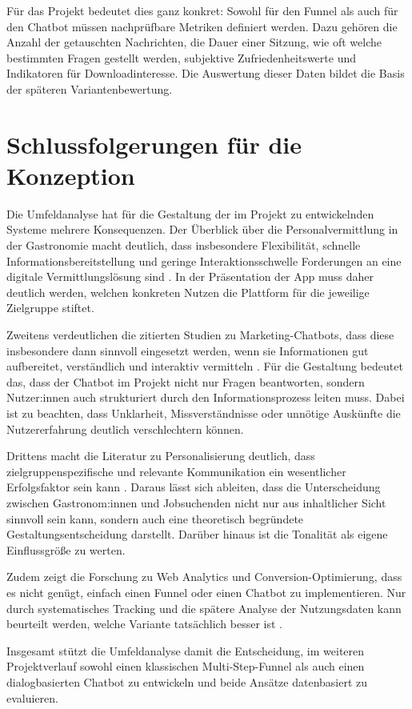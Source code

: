 Für das Projekt bedeutet dies ganz konkret:
Sowohl für den Funnel als auch für den Chatbot müssen nachprüfbare
Metriken definiert werden. Dazu gehören die Anzahl der getauschten
Nachrichten, die Dauer einer Sitzung, wie oft welche bestimmten Fragen
gestellt werden, subjektive Zufriedenheitswerte und Indikatoren
für Downloadinteresse. Die Auswertung dieser Daten bildet die
Basis der späteren Variantenbewertung.

\section{Schlussfolgerungen für die Konzeption}

Die Umfeldanalyse hat für die Gestaltung der im Projekt zu entwickelnden Systeme 
mehrere Konsequenzen. Der Überblick über die Personalvermittlung in der 
Gastronomie macht deutlich, dass insbesondere Flexibilität, schnelle 
Informationsbereitstellung und geringe Interaktionsschwelle Forderungen an eine 
digitale Vermittlungslösung sind \cite{Giousmpasoglou2024,ElHajal2021}.
In der Präsentation der App muss daher deutlich 
werden, welchen konkreten Nutzen die Plattform für die jeweilige Zielgruppe 
stiftet.

Zweitens verdeutlichen die zitierten Studien zu Marketing-Chatbots, dass diese 
insbesondere dann sinnvoll eingesetzt werden, wenn sie Informationen gut 
aufbereitet, verständlich und interaktiv vermitteln \cite{Ling2021,Folstad2020,Jan2023}.
Für die Gestaltung 
bedeutet das, dass der Chatbot im Projekt nicht nur Fragen beantworten, sondern 
Nutzer:innen auch strukturiert durch den Informationsprozess leiten muss. Dabei 
ist zu beachten, dass Unklarheit, Missverständnisse oder unnötige Auskünfte die 
Nutzererfahrung deutlich verschlechtern können.

Drittens macht die Literatur zu Personalisierung deutlich, dass 
zielgruppenspezifische und relevante Kommunikation ein wesentlicher Erfolgsfaktor 
sein kann \cite{Yeo2025metaPersonalizedAdvertising,Kocaballi2019}. Daraus lässt sich ableiten, dass die Unterscheidung zwischen 
Gastronom:innen und Jobsuchenden nicht nur aus inhaltlicher Sicht sinnvoll sein kann, 
sondern auch eine theoretisch begründete Gestaltungsentscheidung darstellt. 
Darüber hinaus ist die Tonalität als eigene Einflussgröße zu werten.

Zudem zeigt die Forschung zu Web Analytics und Conversion-Optimierung,
dass es nicht genügt, einfach einen Funnel oder einen Chatbot zu implementieren. 
Nur durch systematisches Tracking und die spätere Analyse der Nutzungsdaten kann 
beurteilt werden, welche Variante tatsächlich besser ist \cite{GolikGorecka2023,Zimmermann2023,Iftikhar2021}.

Insgesamt stützt die Umfeldanalyse damit die Entscheidung, im weiteren 
Projektverlauf sowohl einen klassischen Multi-Step-Funnel als auch einen 
dialogbasierten Chatbot zu entwickeln und beide Ansätze datenbasiert zu 
evaluieren.
